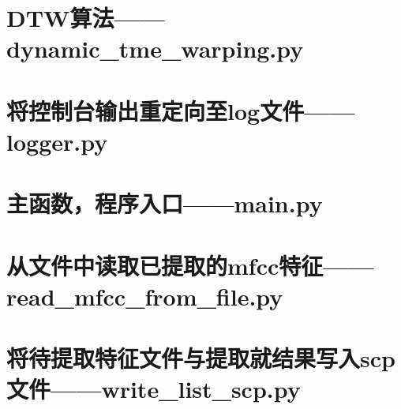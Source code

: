 \documentclass{hitreport}
\begin{document}

\newpage
\begin{appendices}

\section{DTW算法——dynamic\_tme\_warping.py}



\section{将控制台输出重定向至log文件——logger.py}



\section{主函数，程序入口——main.py}



\section{从文件中读取已提取的mfcc特征——read\_mfcc\_from\_file.py}



\section{将待提取特征文件与提取就结果写入scp文件——write\_list\_scp.py}



\end{appendices}
\end{document}
